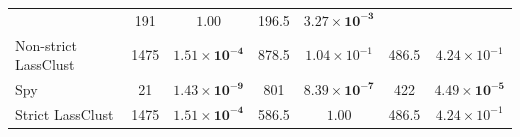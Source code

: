 \documentclass[11pt]{article}
\begin{document}
\begin{table}[H]
\begin{tabular}{lccccc c}
& 191   & $1.00$ 

& 196.5 & $\mathbf{3.27\times10^{-3}}$ \\ 

 

Non-strict LassClust 

& 1475  & $\mathbf{1.51\times10^{-4}}$ 

& 878.5 & $1.04\times10^{-1}$ 

& 486.5 & $4.24\times10^{-1}$ \\ 

 

Spy 

& 21    & $\mathbf{1.43\times10^{-9}}$ 

& 801   & $\mathbf{8.39\times10^{-7}}$ 

& 422   & $\mathbf{4.49\times10^{-5}}$ \\ 

 

Strict LassClust 

& 1475  & $\mathbf{1.51\times10^{-4}}$ 

& 586.5 & $1.00$ 

& 486.5 & $4.24\times10^{-1}$ \\ 

\bottomrule 

\end{tabular} 

\end{table} 

 
\end{document}
